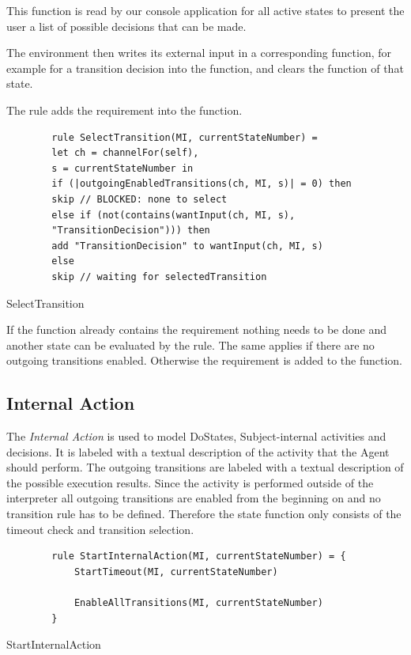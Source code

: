 This function is read by our console application for all active states
to present the user a list of possible decisions that can be made.

The environment then writes its external input in a corresponding function, for
example for a transition decision into the  function, and
clears the  function of that state.

The  rule adds the 
requirement into the  function.

\begin{listing}[H]
	\begin{verbatim}
		rule SelectTransition(MI, currentStateNumber) =
		let ch = channelFor(self),
		s = currentStateNumber in
		if (|outgoingEnabledTransitions(ch, MI, s)| = 0) then
		skip // BLOCKED: none to select
		else if (not(contains(wantInput(ch, MI, s),
		"TransitionDecision"))) then
		add "TransitionDecision" to wantInput(ch, MI, s)
		else
		skip // waiting for selectedTransition
	\end{verbatim}
	\caption{SelectTransition}
	\label{lst:shortasm:SelectTransition}
\end{listing}


If the  function already contains the
 requirement nothing needs to be done and another
state can be evaluated by the  rule.
The same applies if there are no outgoing transitions enabled.
Otherwise the requirement is added to the  function.

\subsection{Internal Action}

The \emph{Internal Action} is used to model DoStates, Subject-internal activities and decisions.
It is labeled with a textual description of the activity that the Agent should perform.
The outgoing transitions are labeled with a textual description of the possible execution results.
Since the activity is performed outside of the interpreter all outgoing transitions are enabled from the beginning on and no transition rule has to be defined.
Therefore the state function only consists of the timeout check and transition selection.

\begin{listing}[H]
	\begin{verbatim}
		rule StartInternalAction(MI, currentStateNumber) = {
			StartTimeout(MI, currentStateNumber)
			
			EnableAllTransitions(MI, currentStateNumber)
		}
	\end{verbatim}
	\caption{StartInternalAction}
	\label{lst:shortasm:StartInternalAction}
\end{listing}

